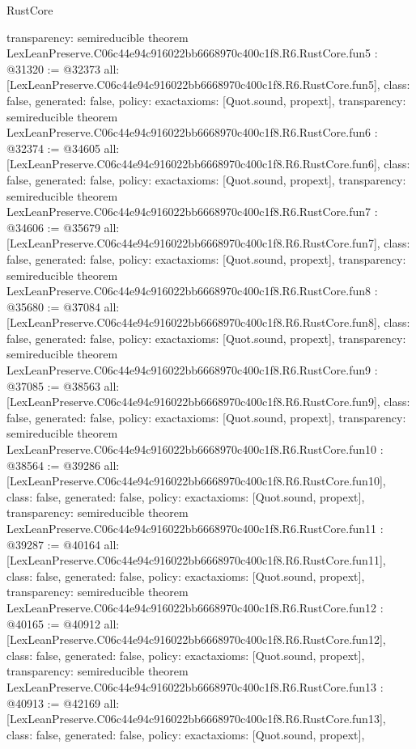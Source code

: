 \begin{lexlean}{RustCore}
\begin{coremodule}
{  transparency: semireducible
}
theorem LexLeanPreserve.C06c44e94c916022bb6668970c400c1f8.R6.RustCore.fun5 : @31320 := @32373 {
  all: [LexLeanPreserve.C06c44e94c916022bb6668970c400c1f8.R6.RustCore.fun5],
  class: false,
  generated: false,
  policy: exact{axioms: [Quot.sound, propext]},
  transparency: semireducible
}
theorem LexLeanPreserve.C06c44e94c916022bb6668970c400c1f8.R6.RustCore.fun6 : @32374 := @34605 {
  all: [LexLeanPreserve.C06c44e94c916022bb6668970c400c1f8.R6.RustCore.fun6],
  class: false,
  generated: false,
  policy: exact{axioms: [Quot.sound, propext]},
  transparency: semireducible
}
theorem LexLeanPreserve.C06c44e94c916022bb6668970c400c1f8.R6.RustCore.fun7 : @34606 := @35679 {
  all: [LexLeanPreserve.C06c44e94c916022bb6668970c400c1f8.R6.RustCore.fun7],
  class: false,
  generated: false,
  policy: exact{axioms: [Quot.sound, propext]},
  transparency: semireducible
}
theorem LexLeanPreserve.C06c44e94c916022bb6668970c400c1f8.R6.RustCore.fun8 : @35680 := @37084 {
  all: [LexLeanPreserve.C06c44e94c916022bb6668970c400c1f8.R6.RustCore.fun8],
  class: false,
  generated: false,
  policy: exact{axioms: [Quot.sound, propext]},
  transparency: semireducible
}
theorem LexLeanPreserve.C06c44e94c916022bb6668970c400c1f8.R6.RustCore.fun9 : @37085 := @38563 {
  all: [LexLeanPreserve.C06c44e94c916022bb6668970c400c1f8.R6.RustCore.fun9],
  class: false,
  generated: false,
  policy: exact{axioms: [Quot.sound, propext]},
  transparency: semireducible
}
theorem LexLeanPreserve.C06c44e94c916022bb6668970c400c1f8.R6.RustCore.fun10 : @38564 := @39286 {
  all: [LexLeanPreserve.C06c44e94c916022bb6668970c400c1f8.R6.RustCore.fun10],
  class: false,
  generated: false,
  policy: exact{axioms: [Quot.sound, propext]},
  transparency: semireducible
}
theorem LexLeanPreserve.C06c44e94c916022bb6668970c400c1f8.R6.RustCore.fun11 : @39287 := @40164 {
  all: [LexLeanPreserve.C06c44e94c916022bb6668970c400c1f8.R6.RustCore.fun11],
  class: false,
  generated: false,
  policy: exact{axioms: [Quot.sound, propext]},
  transparency: semireducible
}
theorem LexLeanPreserve.C06c44e94c916022bb6668970c400c1f8.R6.RustCore.fun12 : @40165 := @40912 {
  all: [LexLeanPreserve.C06c44e94c916022bb6668970c400c1f8.R6.RustCore.fun12],
  class: false,
  generated: false,
  policy: exact{axioms: [Quot.sound, propext]},
  transparency: semireducible
}
theorem LexLeanPreserve.C06c44e94c916022bb6668970c400c1f8.R6.RustCore.fun13 : @40913 := @42169 {
  all: [LexLeanPreserve.C06c44e94c916022bb6668970c400c1f8.R6.RustCore.fun13],
  class: false,
  generated: false,
  policy: exact{axioms: [Quot.sound, propext]},
}
\end{coremodule}
\end{lexlean}
